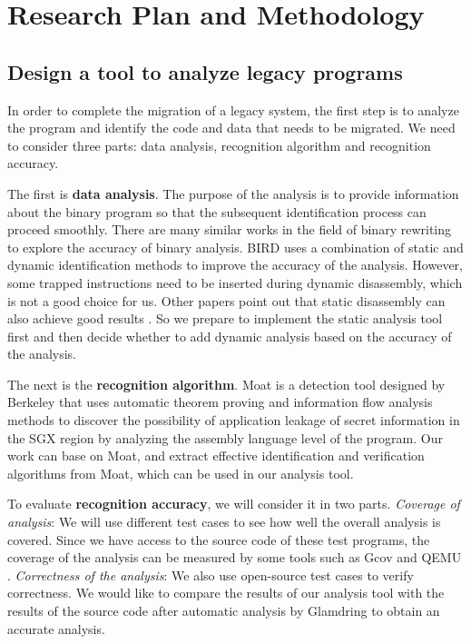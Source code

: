 \section{Research Plan and Methodology}
\subsection{Design a tool to analyze legacy programs}
\label{sec:ToolToAnalyze}
In order to complete the migration of a legacy system, the first step is
to analyze the program and identify the code and data that needs to be migrated.
We need to consider three parts: data analysis, recognition algorithm
and recognition accuracy.

The first is \textbf{data analysis}. The purpose of the analysis is to provide
information about the binary program so that the subsequent identification process
can proceed smoothly.
There are many similar works in the field of binary rewriting to explore
the accuracy of binary analysis.
BIRD \cite{Nanda2006BIRDBI} uses a combination of static and dynamic identification
methods to improve the accuracy of the analysis. However, some trapped instructions
need to be inserted during dynamic disassembly, which is not a good choice for us.
Other papers point out that static disassembly can also achieve good results
\cite{Andriesse2016AnIA}. So we prepare to implement the static analysis tool first
and then decide whether to add dynamic analysis based on the accuracy of the analysis.

The next is the \textbf{recognition algorithm}.
Moat \cite{Sinha2015MoatVC} is a detection tool designed by Berkeley that uses
automatic theorem proving and information flow analysis methods to discover the
possibility of application leakage of secret information in the SGX region by
analyzing the assembly language level of the program.
Our work can base on Moat, and extract effective identification and verification
algorithms from Moat, which can be used in our analysis tool.

To evaluate \textbf{recognition accuracy}, we will consider it in two parts.
\textit{Coverage of analysis}:
We will use different test cases to see how well the overall analysis is covered.
Since we have access to the source code of these test programs,
the coverage of the analysis can be measured by some tools such as Gcov \cite{GCOV}
and QEMU \cite{Bellard2005QEMUAF}.
\textit{Correctness of the analysis}:
We also use open-source test cases to verify correctness.
We would like to compare the results of our analysis tool with the results of the
source code after automatic analysis by Glamdring \cite{Lind2017GlamdringAA} to obtain
an accurate analysis.

